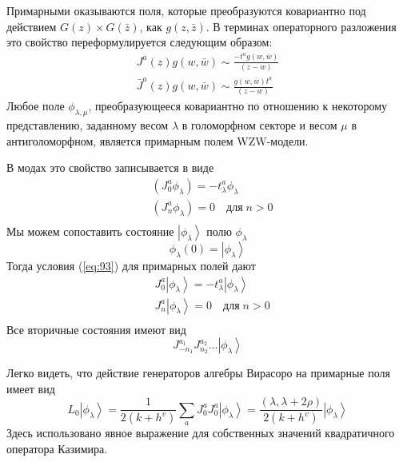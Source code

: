Примарными оказываются поля, которые преобразуются ковариантно под действием $G(z)\times G(\bar z)$,
как $g(z,\bar z)$. В терминах операторного разложения это свойство переформулируется следующим
образом:
\begin{equation}
  \label{eq:84}
  \begin{aligned}
    J^a(z)g(w,\bar w)\sim \frac{-t^a g(w,\bar w)}{(z-w)}\\
    \bar J^a(z)g(w,\bar w)\sim \frac{ g(w,\bar w)t^a}{(z-w)}
  \end{aligned}
\end{equation}
Любое поле $\phi_{\lambda,\mu}$, преобразующееся ковариантно по отношению к некоторому
представлению, заданному весом $\lambda$ в голоморфном секторе и весом $\mu$ в антиголоморфном,
является примарным полем WZW-модели.

В модах это свойство записывается в виде
\begin{equation}
  \label{eq:93}
  \begin{aligned}
    & (J_0^a \phi_{\lambda})=-t^a_{\lambda}\phi_{\lambda}\\
    & (J^a_n\phi_{\lambda})=0\quad \mbox{для}\; n>0\\
  \end{aligned}
\end{equation}
Мы можем сопоставить состояние $\left|\phi_{\lambda}\right>$ полю $\phi_{\lambda}$
  \begin{equation}
    \label{eq:94}
    \phi_{\lambda}(0)=\left|\phi_{\lambda}\right>
  \end{equation}
Тогда условия (\ref{eq:93}) для примарных полей дают
\begin{equation}
  \label{eq:95}
  \begin{aligned}
    & J_0^a\left|\phi_{\lambda}\right>=-t^a_{\lambda}\left|\phi_{\lambda}\right>\\
    & J^a_n\left|\phi_{\lambda}\right>=0 \quad \mbox{для}\; n>0 \\
  \end{aligned}
\end{equation}
Все вторичные состояния имеют вид
\begin{equation}
  \label{eq:97}
  J^{a_1}_{-n_1}J^{a_2}_{n_2}\dots\left|\phi_{\lambda}\right>
\end{equation}

Легко видеть, что действие генераторов алгебры Вирасоро на примарные поля имеет вид
\begin{equation}
  \label{eq:96}
  L_0\left|\phi_{\lambda}\right>=\frac{1}{2(k+h^v)}\sum_aJ^a_0J^a_0\left|\phi_{\lambda}\right>=\frac{(\lambda,\lambda+2\rho)}{2(k+h^v)}\left|\phi_{\lambda}\right>
\end{equation}
Здесь использовано явное выражение для собственных значений квадратичного оператора Казимира.

